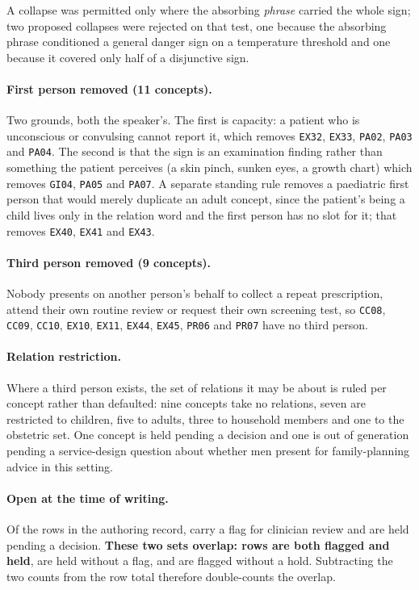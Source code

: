 A collapse was permitted only where the
absorbing \emph{phrase} carried the whole sign; two proposed collapses were
rejected on that test, one because the absorbing phrase conditioned a general
danger sign on a temperature threshold and one because it covered only half of a
disjunctive sign.

\paragraph{First person removed (11 concepts).} Two grounds, both the speaker's.
The first is capacity: a patient who is unconscious or convulsing cannot report
it, which removes \texttt{EX32}, \texttt{EX33}, \texttt{PA02}, \texttt{PA03} and
\texttt{PA04}. The second is that the sign is an examination finding rather than
something the patient perceives (a skin pinch, sunken eyes, a growth chart)
which removes \texttt{GI04}, \texttt{PA05} and \texttt{PA07}. A separate standing
rule removes a paediatric first person that would merely duplicate an adult
concept, since the patient's being a child lives only in the relation word and
the first person has no slot for it; that removes \texttt{EX40}, \texttt{EX41}
and \texttt{EX43}.

\paragraph{Third person removed (9 concepts).} Nobody presents on another
person's behalf to collect a repeat prescription, attend their own routine review
or request their own screening test, so \texttt{CC08}, \texttt{CC09},
\texttt{CC10}, \texttt{EX10}, \texttt{EX11}, \texttt{EX44}, \texttt{EX45},
\texttt{PR06} and \texttt{PR07} have no third person.

\paragraph{Relation restriction.} Where a third person exists, the set of
relations it may be about is ruled per concept rather than defaulted: nine
concepts take no relations, seven are restricted to children, five to adults,
three to household members and one to the obstetric set. One concept is held
pending a decision and one is out of generation pending a service-design question
about whether men present for family-planning advice in this setting.

\paragraph{Open at the time of writing.} Of the \CorpusRows{} rows in the
authoring record, \CorpusFlagged{} carry a flag for clinician review and
\CorpusHeld{} are held pending a decision. \textbf{These two sets overlap:
\CorpusFlaggedAndHeld{} rows are both flagged and held}, \CorpusHeldOnly{} are
held without a flag, and \CorpusFlaggedOnly{} are flagged without a hold.
Subtracting the two counts from the row total therefore double-counts the
overlap.

